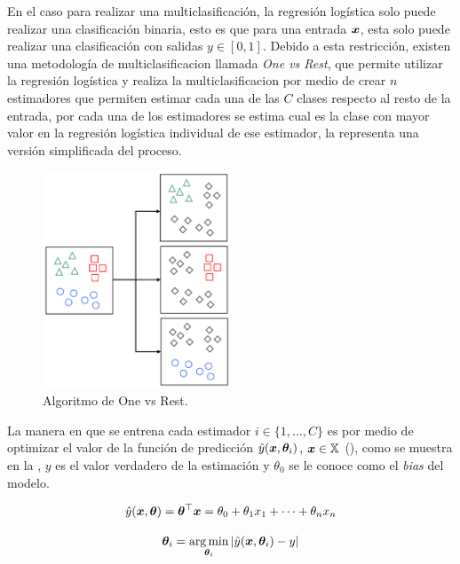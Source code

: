 En el caso para realizar una multiclasificaci\'on, la regresión logística solo puede realizar una clasificación binaria, esto es que para una entrada ${\bm{x}}$, esta solo puede realizar una clasificación con salidas $y \in [0, 1]$. Debido a esta restricción, existen una metodología de multiclasificacion llamada \emph{One vs Rest}, que permite utilizar la regresión logística y realiza la multiclasificacion por medio de crear $n$ estimadores que permiten estimar cada una de las $C$ clases respecto al resto de la entrada, por cada una de los estimadores se estima cual es la clase con mayor valor en la regresión logística individual de ese estimador, la  representa una versión simplificada del proceso.

\begin{figure}[H]
  \centering
  \includegraphics[width=0.5\textwidth]{Figures/one-vs-rest.pdf}
\decoRule
\caption[Algoritmo de One vs Rest]{Algoritmo de One vs Rest.}
\label{fig:ovr-algo}
\end{figure}

La manera en que se entrena cada estimador $i \in \{1, \ldots, C\}$ es por medio de optimizar el valor de la función de predicción $\hat{y}({\bm{x}}, {\bm{\theta}}_i)$, ${\bm{x}} \in {\mathbb{X}}$ (), como se muestra en la , $y$ es el valor verdadero de la estimación y $\theta_0$ se le conoce como el \emph{bias} del modelo.

\begin{equation} \label{eq:linear-regression-training}
  \hat{y}({\bm{x}}, {\bm{\theta}}) = {\bm{\theta}}^{\top} {\bm{x}} = \theta_0 + \theta_1 x_1 + \cdots + \theta_n x_n
\end{equation}

\begin{equation} \label{eq:linear-regression-estimation}
  {\bm{\theta}}_i = \operatorname*{arg\,min}_{{\bm{\theta}}_i} | \hat{y}({\bm{x}}, {\bm{\theta}}_i) - y|
\end{equation}

